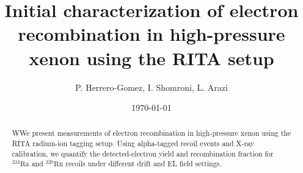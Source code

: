 \documentclass[a4paper,11pt, english]{article}
\title{Initial characterization of electron recombination in high-pressure xenon using the RITA setup}
\author{P. Herrero-Gomez, I. Shomroni, L. Arazi}
\date{\today}
\newcommand{\isotope}[2]{\ensuremath{^{#2}\mathrm{#1}}}
\begin{document}
\maketitle

\begin{abstract}
    WWe present measurements of electron recombination in high-pressure xenon using the RITA
    radium-ion tagging setup. Using alpha-tagged recoil events and X-ray calibration, we quantify
    the detected-electron yield and recombination fraction for \isotope{Ra}{224} and
    \isotope{Rn}{220} recoils under different drift and EL field settings.
\end{abstract}

\tableofcontents








\appendix




\end{document}
